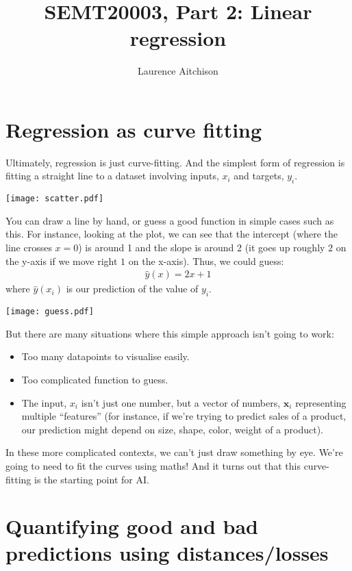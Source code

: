 \documentclass{article}
\title{SEMT20003, Part 2: Linear regression}
\author{Laurence Aitchison}
\date{}
\newcommand{\x}{\mathbf{x}}
\begin{document}
\maketitle

\section{Regression as curve fitting}
Ultimately, regression is just curve-fitting.
And the simplest form of regression is fitting a straight line to a dataset involving inputs, $x_i$ and targets, $y_i$.
\begin{center}
  \texttt{[image: scatter.pdf]}
\end{center}
You can draw a line by hand, or guess a good function in simple cases such as this.
For instance, looking at the plot, we can see that the intercept (where the line crosses $x=0$) is around 1 and the slope is around 2 (it goes up roughly $2$ on the y-axis if we move right $1$ on the x-axis).
Thus, we could guess:
\begin{align}
  \hat{y}(x) = 2 x + 1
\end{align}
where $\hat{y}(x_i)$ is our prediction of the value of $y_i$.
\begin{center}
  \texttt{[image: guess.pdf]}
\end{center}
But there are many situations where this simple approach isn't going to work:
\begin{itemize}
  \item Too many datapoints to visualise easily.
  \item Too complicated function to guess.
  \item The input, $x_i$ isn't just one number, but a vector of numbers, $\x_i$ representing multiple ``features'' (for instance, if we're trying to predict sales of a product, our prediction might depend on size, shape, color, weight of a product).
\end{itemize}
In these more complicated contexts, we can't just draw something by eye.
We're going to need to fit the curves using maths!
And it turns out that this curve-fitting is the starting point for AI.

\section{Quantifying good and bad predictions using distances/losses}
\end{document}
